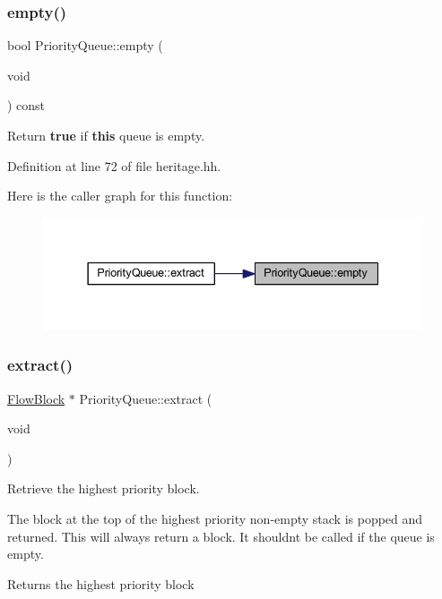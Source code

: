 \subsubsection{\texorpdfstring{empty()}{empty()}}
{\footnotesize\ttfamily bool Priority\+Queue\+::empty (\begin{DoxyParamCaption}\item[{void}]{ }\end{DoxyParamCaption}) const\hspace{0.3cm}{\ttfamily [inline]}}



Return {\bfseries{true}} if {\bfseries{this}} queue is empty. 



Definition at line 72 of file heritage.\+hh.

Here is the caller graph for this function\+:
\nopagebreak
\begin{figure}[H]
\begin{center}
\leavevmode
\includegraphics[width=337pt]{class_priority_queue_aa52c8c07deead26f255cdbe92a0acd4e_icgraph}
\end{center}
\end{figure}
\mbox{\label{class_priority_queue_a6cd7194cc2cb973f33158a1d7dc7acc9}} 
\subsubsection{\texorpdfstring{extract()}{extract()}}
{\footnotesize\ttfamily \mbox{\hyperlink{class_flow_block}{Flow\+Block}} $\ast$ Priority\+Queue\+::extract (\begin{DoxyParamCaption}\item[{void}]{ }\end{DoxyParamCaption})}



Retrieve the highest priority block. 

The block at the top of the highest priority non-\/empty stack is popped and returned. This will always return a block. It shouldn\textquotesingle{}t be called if the queue is empty. \begin{DoxyReturn}{Returns}
the highest priority block 
\end{DoxyReturn}


